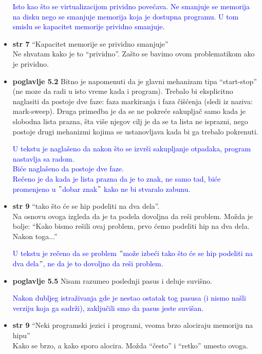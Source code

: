 \documentclass[a4paper]{report}
\newcommand{\odgovor}[1]{\textcolor{blue}{#1}}
\begin{document}
\begin{itemize}
\odgovor{Isto kao što se virtualizacijom prividno povećava. Ne smanjuje se memorija na disku nego se smanjuje memorija koja je dostupna programu. U tom smislu se kapacitet memorije prividno smanjuje.}

\item \textbf{str 7} ``Kapacitet memorije se prividno smanjuje'' \\ Ne shvatam kako je to ``prividno''. Zašto se bavimo ovom problematikom ako je prividno.
\item \textbf{poglavlje 5.2} Bitno je napomenuti da je glavni mehanizam tipa ``start-stop'' (ne moze da radi u isto vreme kada i program). Trebalo bi eksplicitno naglasiti da postoje dve faze: faza markiranja i faza čišćenja (sledi iz naziva: mark-sweep). Druga primedba je da se ne pokreće sakupljač samo kada je slobodna lista prazna, šta više njegov cilj je da se ta lista ne isprazni, nego postoje drugi mehanizmi kojima se ustanovljava kada bi ga trebalo pokrenuti.

\odgovor{U tekstu je naglašeno da nakon što se izvrši sakupljanje otpadaka, program nastavlja sa radom.\\
Biće naglašeno da postoje dve faze. \\
Rečeno je da kada je lista prazna da je to znak, ne samo tad, biće promenjeno u $"$dobar znak$"$ kako ne bi stvaralo zabunu.}
\item \textbf{str 9} ``tako što će se hip podeliti na dva dela''. \\ Na osnovu ovoga izgleda da je ta podela dovoljna da reši problem. Možda je bolje: ``Kako bismo rešili ovaj problem, prvo ćemo podeliti hip na dva dela. Nakon toga...''

\odgovor{U tekstu je rečeno da se problem $"$može izbeći tako što će se hip podeliti na dva dela$"$, ne da je to dovoljno da reši problem.}

\item \textbf{poglavlje 5.5} Nisam razumeo poslednji pasus i deluje suvišno.

\odgovor{Nakon dubljeg istraživanja gde je nestao ostatak tog pasusa (i nismo našli verziju koja ga sadrži), zaključili smo da pasus jeste suvišan.}
\item \textbf{str 9} ``Neki programski jezici i programi, veoma brzo alociraju memoriju na hipu'' \\ Kako se brzo, a kako sporo alocira. Možda ``često'' i ``retko'' umesto ovoga.


\end{itemize}
\end{document}
